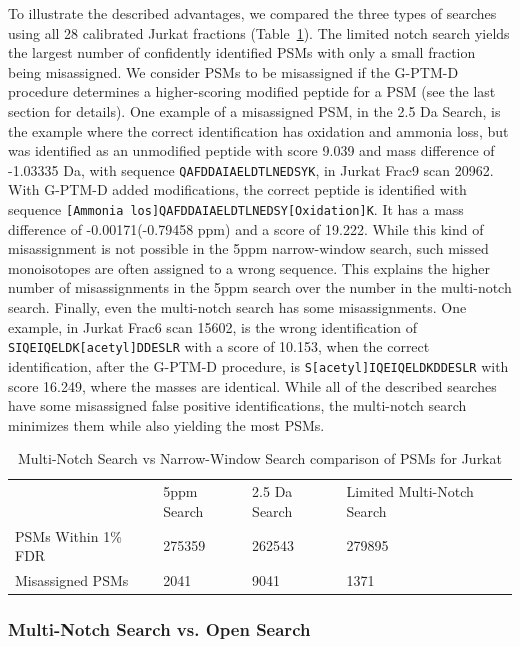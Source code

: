 \documentclass[journal=jprobs,manuscript=article]{achemso}
\begin{document}
To illustrate the described advantages, we compared the three types of searches using all 28 calibrated Jurkat fractions (Table~\ref{tbl:singleVsMultiNotch}).
The limited notch search yields the largest number of confidently identified PSMs with only a small fraction being misassigned.
We consider PSMs to be misassigned if the G-PTM-D procedure determines a higher-scoring modified peptide for a PSM (see the last section for details).
One example of a misassigned PSM, in the 2.5 Da Search, is the example where the correct identification has oxidation and ammonia loss, but was identified as an unmodified peptide with score 9.039 and mass difference of -1.03335 Da, with sequence \texttt{QAFDDAIAELDTLNEDSYK}, in Jurkat Frac9 scan 20962.
With G-PTM-D added modifications, the correct peptide is identified with sequence \texttt{[Ammonia los]QAFDDAIAELDTLNEDSY[Oxidation]K}. It has a mass difference of -0.00171(-0.79458 ppm) and a score of 19.222.
While this kind of misassignment is not possible in the 5ppm narrow-window search, such missed monoisotopes are often assigned to a wrong sequence.
This explains the higher number of misassignments in the 5ppm search over the number in the multi-notch search.
Finally, even the multi-notch search has some misassignments.
One example, in Jurkat Frac6 scan 15602, is the wrong identification of \texttt{SIQEIQELDK[acetyl]DDESLR} with a score of 10.153, when the correct identification, after the G-PTM-D procedure, is \texttt{S[acetyl]IQEIQELDKDDESLR} with score 16.249, where the masses are identical.
While all of the described searches have some misassigned false positive identifications, the multi-notch search minimizes them while also yielding the most PSMs.

\begin{table}[]
\centering
\caption{Multi-Notch Search vs Narrow-Window Search comparison of PSMs for Jurkat}
\label{tbl:singleVsMultiNotch}
\begin{tabular}{llll}
                    & 5ppm Search & 2.5 Da Search & Limited Multi-Notch Search \\
PSMs Within 1\% FDR & 275359      & 262543        & 279895       \\
Misassigned PSMs    & 2041           & 9041          & 1371            \\
\end{tabular}
\end{table}

\subsubsection{Multi-Notch Search vs. Open Search}
\end{document}
